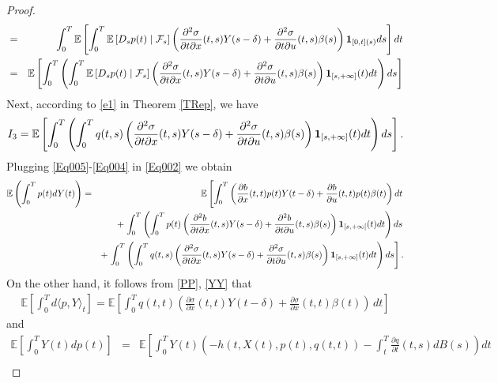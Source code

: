 \documentclass[12pt]{article}
\theoremstyle{remark}
\numberwithin{equation}{section}
\def\E{\mathbb E}
\def\E{\mathbb E}
\begin{document}
\begin{proof}
\begin{eqnarray*}
	&=&\int_0^T \mathbb{E} \left[ \int_0^T \mathbb{E}\left[ D_s p(t) \mid \mathcal{F}_s \right]\left(\frac{\partial^{2} \sigma}{\partial t \partial x}(t, s)Y(s-\delta)+\frac{\partial^{2} \sigma}{\partial t \partial u}(t, s)\beta(s)\right){\bf 1 }_{[0,t](s)}ds \right] dt\\
	&=&\mathbb{E}\left[\int_0^T \left( \int_0^T \mathbb{E}\left[ D_s p(t) \mid \mathcal{F}_s \right]\left(\frac{\partial^{2} \sigma}{\partial t \partial x}(t, s)Y(s-\delta)+\frac{\partial^{2} \sigma}{\partial t \partial u}(t, s)\beta(s)\right){\bf 1 }_{[s,+\infty]}(t)dt \right) ds\right]\end{eqnarray*}
Next, according to \eqref{e1} in Theorem \ref{TRep}, we have
\begin{eqnarray}\label{Eq004}
	I_3=\mathbb{E}\left[\int_0^T \left( \int_0^T q(t,s)\left(\frac{\partial^{2} \sigma}{\partial t \partial x}(t, s)Y(s-\delta)+\frac{\partial^{2} \sigma}{\partial t \partial u}(t, s)\beta(s)\right){\bf 1 }_{[s,+\infty]}(t)dt \right) ds\right].
\end{eqnarray}
Plugging \eqref{Eq005}-\eqref{Eq004} in \eqref{Eq002} we obtain
\begin{eqnarray}\label{Eq006bis}
\E\left(\int_0^T p(t)dY(t)\right)&=& \E\left[\int_0^T\left(\frac{\partial b}{\partial x}(t, t)p(t) Y(t-\delta)+\frac{\partial b}{\partial u}(t, t)p(t) \beta(t)\right)dt\right.\nonumber\\
&&+\left. \int_0^T \left( \int_0^T p(t) \left(\frac{\partial^{2}
	b}{\partial t \partial x}(t, s)Y(s-\delta)+\frac{\partial^{2}
		b}{\partial t \partial u}(t, s)\beta(s)\right){\bf 1 }_{[s,+\infty[}(t)dt\right)ds\right.\nonumber\\
&&+\left.\int_0^T \left( \int_0^T q(t,s)\left(\frac{\partial^{2} \sigma}{\partial t \partial x}(t, s)Y(s-\delta)+\frac{\partial^{2} \sigma}{\partial t \partial u}(t, s)\beta(s)\right){\bf 1 }_{[s,+\infty]}(t)dt \right) ds\right].\nonumber\\
\end{eqnarray}
On the other hand, it follows from \eqref{PP}, \eqref{YY} that
\begin{eqnarray}\label{PY}
\mathbb{E} \left[ \int_0^T d\langle p, Y \rangle_t \right] = \mathbb{E}\left[ \int_{0}^{T}q(t,t)\left( \frac{\partial \sigma}{\partial x}(t,t)Y(t-\delta) + \frac{\partial \sigma}{\partial x}(t,t)\beta(t)\right)\,dt\right]
\end{eqnarray}
and
\begin{eqnarray}\label{Eq007}
\E\left[\int_{0}^{T}Y(t)dp(t)\right]&=&\E\left[\int_{0}^{T}Y(t)\left(-h(t,X(t),p(t),q(t,t))-\int_{t}^{T}\frac{\partial q}{\partial t}(t,s)dB(s)\right)dt\nonumber\right.\\

\end{eqnarray}
\end{proof}
\end{document}

